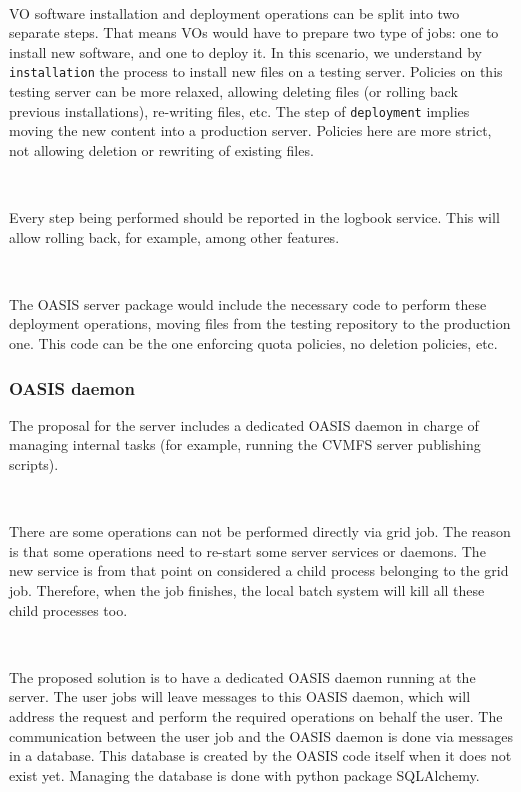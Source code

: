 \documentclass{article}
\begin{document}
~

VO software installation and deployment operations can be split into two separate steps.
That means VOs would have to prepare two type of jobs: one to install new software, 
and one to deploy it.
In this scenario, we understand by \verb+installation+
the process to install new files on a testing server. 
Policies on this testing server can be more relaxed, allowing deleting files
(or rolling back previous installations), re-writing files, etc.
The step of \verb+deployment+ implies moving the new content into
a production server. Policies here are more strict, not allowing deletion 
or rewriting of existing files. 

~

Every step being performed should be reported in the logbook service.
This will allow rolling back, for example, among other features.

~

The OASIS server package would include the necessary code to perform these deployment operations, 
moving files from the testing repository to the production one. 
This code can be the one enforcing quota policies, no deletion policies, etc.

\subsubsection{OASIS daemon}

The proposal for the server includes a dedicated OASIS daemon in charge of managing internal tasks 
(for example, running the CVMFS server publishing scripts). 

~

There are some operations can not be performed directly via grid job. 
The reason is that some operations need to re-start some server services or daemons. 
The new service is from that point on considered a child process belonging to the grid job. 
Therefore, when the job finishes, the local batch system will kill all these child processes too. 

~

The proposed solution is to have a dedicated OASIS daemon running at the server. 
The user jobs will leave messages to this OASIS daemon, 
which will address the request and perform the required operations on behalf the user. 
The communication between the user job and the OASIS daemon is done via messages in a database. 
This database is created by the OASIS code itself when it does not exist yet. 
Managing the database is done with python package SQLAlchemy.
\end{document}
